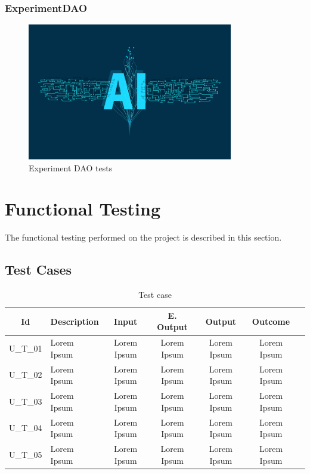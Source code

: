 \newpage
\subsubsection{ExperimentDAO}
\begin{figure}[ht!]
    \centering
    \includegraphics[width=0.8\textwidth]{images/placeholder.jpg}
    \caption{Experiment DAO tests}
    \label{fig:e_dao_test}
\end{figure}

\newpage
\section{Functional Testing}

The functional testing performed on the project is described in this section.

\subsection{Test Cases}

\begin{table}[ht!]
    \centering
    \caption{Test case}
    \begin{tabularx}{\textwidth}{|Sl|S{X}|S{X}|S{X}|S{X}|S{X}|}
        \hline
        \textbf{Id} & \textbf{Description} & \textbf{Input} & \textbf{E. Output} & \textbf{Output} & \textbf{Outcome} \\ \hline
        U\_T\_01    & Lorem Ipsum          & Lorem Ipsum    & Lorem Ipsum         & Lorem Ipsum     & Lorem Ipsum      \\ \hline
        U\_T\_02    & Lorem Ipsum          & Lorem Ipsum    & Lorem Ipsum         & Lorem Ipsum     & Lorem Ipsum      \\ \hline
        U\_T\_03    & Lorem Ipsum          & Lorem Ipsum    & Lorem Ipsum         & Lorem Ipsum     & Lorem Ipsum      \\ \hline
        U\_T\_04    & Lorem Ipsum          & Lorem Ipsum    & Lorem Ipsum         & Lorem Ipsum     & Lorem Ipsum      \\ \hline
        U\_T\_05    & Lorem Ipsum          & Lorem Ipsum    & Lorem Ipsum         & Lorem Ipsum     & Lorem Ipsum      \\ \hline
    \end{tabularx}
\end{table}

